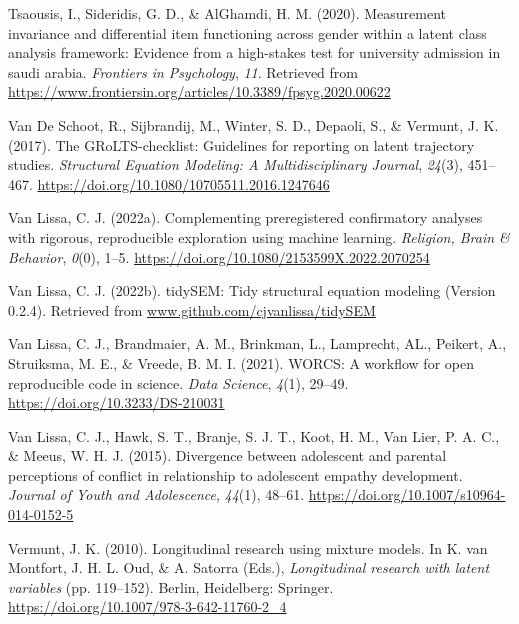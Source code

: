 \documentclass[
  ,man,floatsintext]{apa6}
\newlength{\cslhangindent}
\newlength{\cslentryspacingunit} %
\newenvironment{CSLReferences}[2] %
 {%
  \setlength{\parindent}{0pt}
  \ifodd #1
  \let\oldpar\par
  \def\par{\hangindent=\cslhangindent\oldpar}
  \fi
  \setlength{\parskip}{#2\cslentryspacingunit}
 }%
 {}
\begin{document}
\begin{CSLReferences}{1}{0}
\leavevmode{}%
Tsaousis, I., Sideridis, G. D., \& AlGhamdi, H. M. (2020). Measurement invariance and differential item functioning across gender within a latent class analysis framework: Evidence from a high-stakes test for university admission in saudi arabia. \emph{Frontiers in Psychology}, \emph{11}. Retrieved from \url{https://www.frontiersin.org/articles/10.3389/fpsyg.2020.00622}

\leavevmode{}%
Van De Schoot, R., Sijbrandij, M., Winter, S. D., Depaoli, S., \& Vermunt, J. K. (2017). The {GRoLTS}-checklist: Guidelines for reporting on latent trajectory studies. \emph{Structural Equation Modeling: A Multidisciplinary Journal}, \emph{24}(3), 451--467. \url{https://doi.org/10.1080/10705511.2016.1247646}

\leavevmode{}%
Van Lissa, C. J. (2022a). Complementing preregistered confirmatory analyses with rigorous, reproducible exploration using machine learning. \emph{Religion, Brain \& Behavior}, \emph{0}(0), 1--5. \url{https://doi.org/10.1080/2153599X.2022.2070254}

\leavevmode{}%
Van Lissa, C. J. (2022b). {tidySEM}: Tidy structural equation modeling (Version 0.2.4). Retrieved from \href{https://www.github.com/cjvanlissa/tidySEM}{www.github.com/cjvanlissa/tidySEM}

\leavevmode{}%
Van Lissa, C. J., Brandmaier, A. M., Brinkman, L., Lamprecht, AL., Peikert, A., Struiksma, M. E., \& Vreede, B. M. I. (2021). {WORCS}: A workflow for open reproducible code in science. \emph{Data Science}, \emph{4}(1), 29--49. \url{https://doi.org/10.3233/DS-210031}

\leavevmode{}%
Van Lissa, C. J., Hawk, S. T., Branje, S. J. T., Koot, H. M., Van Lier, P. A. C., \& Meeus, W. H. J. (2015). Divergence between adolescent and parental perceptions of conflict in relationship to adolescent empathy development. \emph{Journal of Youth and Adolescence}, \emph{44}(1), 48--61. \url{https://doi.org/10.1007/s10964-014-0152-5}

\leavevmode{}%
Vermunt, J. K. (2010). Longitudinal research using mixture models. In K. van Montfort, J. H. L. Oud, \& A. Satorra (Eds.), \emph{Longitudinal research with latent variables} (pp. 119--152). Berlin, Heidelberg: Springer. \url{https://doi.org/10.1007/978-3-642-11760-2_4}


\end{CSLReferences}
\end{document}
